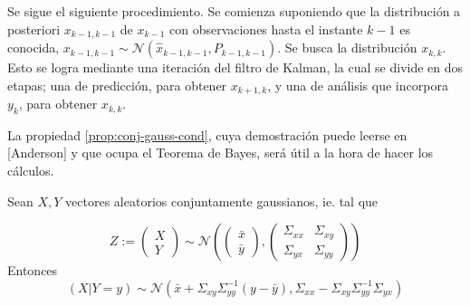 Se sigue el siguiente procedimiento. Se comienza suponiendo que la distribución a posteriori \(x_{k-1, k-1}\) de \(x_{k-1}\) con observaciones hasta el instante \(k-1\) es conocida, \(x_{k-1, k-1} \sim \mathcal{N}(\hat{x}_{k-1, k-1}, P_{k-1, k-1})\). Se busca la distribución \(x_{k, k}\). Esto se logra mediante una iteración del filtro de Kalman, la cual se divide en dos etapas; una de predicción, para obtener \(x_{k+1, k}\), y una de análisis que incorpora \(y_k\), para obtener \(x_{k, k}\).

La propiedad \ref{prop:conj-gauss-cond}, cuya demostración puede leerse en [Anderson] y que ocupa el Teorema de Bayes, será útil a la hora de hacer los cálculos.


\begin{prop}
\label{prop:conj-gauss-cond}
Sean \(X, Y\) vectores aleatorios conjuntamente
gaussianos, ie. tal que

\[
Z := \begin{pmatrix}
X\\
Y
\end{pmatrix} \sim \mathcal{N}\left(
\begin{pmatrix}
\bar{x} \\
\bar{y}
\end{pmatrix}, 
\begin{pmatrix}
\Sigma_{xx} & \Sigma_{xy} \\
\Sigma_{yx} & \Sigma_{yy}
\end{pmatrix}
\right)
\] Entonces \[
(X|Y=y) \sim \mathcal{N} \left( \bar{x} + \Sigma_{xy}\Sigma_{yy}^{-1}(y-\bar{y}),
\Sigma_{xx} - \Sigma_{xy}\Sigma_{yy}^{-1}\Sigma_{yx}
 \right)
\]
\end{prop}


